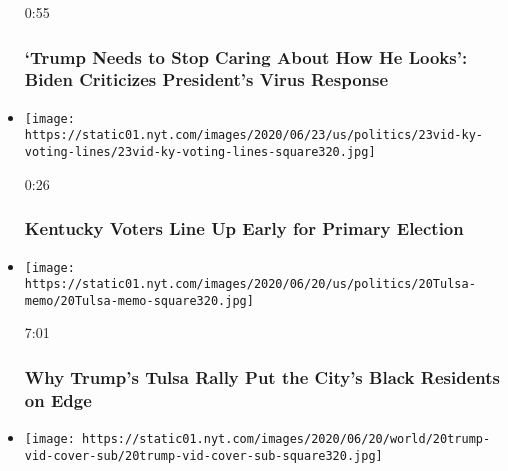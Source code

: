 \begin{itemize}
  0:55

  \hypertarget{trump-needs-to-stop-caring-about-how-he-looks-biden-criticizes-presidents-virus-response}{%
  \subsubsection{`Trump Needs to Stop Caring About How He Looks': Biden
  Criticizes President's Virus
  Response}\label{trump-needs-to-stop-caring-about-how-he-looks-biden-criticizes-presidents-virus-response}}
\item
  \href{https://www.nytimes.com/video/us/100000007205944/kentucky-primary-voting.html?action=click\&module=video-series-bar\&region=header\&pgtype=Article\&playlistId=video/2020-Elections}{}

  \texttt{[image: https://static01.nyt.com/images/2020/06/23/us/politics/23vid-ky-voting-lines/23vid-ky-voting-lines-square320.jpg]}

  0:26

  \hypertarget{kentucky-voters-line-up-early-for-primary-election}{%
  \subsubsection{Kentucky Voters Line Up Early for Primary
  Election}\label{kentucky-voters-line-up-early-for-primary-election}}
\item
  \href{https://www.nytimes.com/video/us/100000007188759/trump-rally-juneteenth-tulsa-oklahoma.html?action=click\&module=video-series-bar\&region=header\&pgtype=Article\&playlistId=video/2020-Elections}{}

  \texttt{[image: https://static01.nyt.com/images/2020/06/20/us/politics/20Tulsa-memo/20Tulsa-memo-square320.jpg]}

  7:01

  \hypertarget{why-trumps-tulsa-rally-put-the-citys-black-residents-on-edge}{%
  \subsubsection{Why Trump's Tulsa Rally Put the City's Black Residents
  on
  Edge}\label{why-trumps-tulsa-rally-put-the-citys-black-residents-on-edge}}
\item
  \href{https://www.nytimes.com/video/us/politics/100000007202285/trump-tulsa-rally-coronavirus.html?action=click\&module=video-series-bar\&region=header\&pgtype=Article\&playlistId=video/2020-Elections}{}

  \texttt{[image: https://static01.nyt.com/images/2020/06/20/world/20trump-vid-cover-sub/20trump-vid-cover-sub-square320.jpg]}


\end{itemize}
